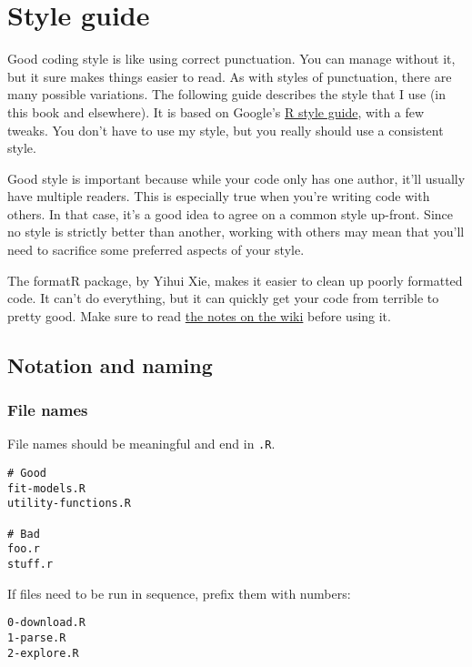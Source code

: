\chapter{Style guide}\label{style}

Good coding style is like using correct punctuation. You can manage
without it, but it sure makes things easier to read. As with styles of
punctuation, there are many possible variations. The following guide
describes the style that I use (in this book and elsewhere). It is based
on Google's
\href{http://google-styleguide.googlecode.com/svn/trunk/google-r-style.html}{R
style guide}, with a few tweaks. You don't have to use my style, but you
really should use a consistent style. 

Good style is important because while your code only has one author,
it'll usually have multiple readers. This is especially true when you're
writing code with others. In that case, it's a good idea to agree on a
common style up-front. Since no style is strictly better than another,
working with others may mean that you'll need to sacrifice some
preferred aspects of your style.

The formatR package, by Yihui Xie, makes it easier to clean up poorly
formatted code. It can't do everything, but it can quickly get your code
from terrible to pretty good. Make sure to read
\href{https://github.com/yihui/formatR/wiki}{the notes on the wiki}
before using it.

\section{Notation and naming}

\subsection{File names}

File names should be meaningful and end in \texttt{.R}.

\begin{verbatim}
# Good
fit-models.R
utility-functions.R

# Bad
foo.r
stuff.r
\end{verbatim}

If files need to be run in sequence, prefix them with numbers:

\begin{verbatim}
0-download.R
1-parse.R
2-explore.R
\end{verbatim}

